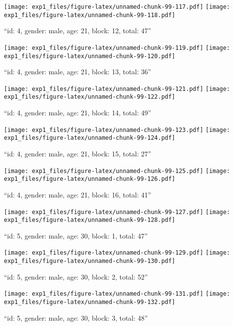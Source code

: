 \documentclass[,]{article}
\begin{document}
\texttt{[image: exp1\_files/figure-latex/unnamed-chunk-99-117.pdf]}
\texttt{[image: exp1\_files/figure-latex/unnamed-chunk-99-118.pdf]}

\newpage
[1] 

``id: 4, gender: male, age: 21, block: 12, total: 47''

\texttt{[image: exp1\_files/figure-latex/unnamed-chunk-99-119.pdf]}
\texttt{[image: exp1\_files/figure-latex/unnamed-chunk-99-120.pdf]}

\newpage
[1] 

``id: 4, gender: male, age: 21, block: 13, total: 36''

\texttt{[image: exp1\_files/figure-latex/unnamed-chunk-99-121.pdf]}
\texttt{[image: exp1\_files/figure-latex/unnamed-chunk-99-122.pdf]}

\newpage
[1] 

``id: 4, gender: male, age: 21, block: 14, total: 49''

\texttt{[image: exp1\_files/figure-latex/unnamed-chunk-99-123.pdf]}
\texttt{[image: exp1\_files/figure-latex/unnamed-chunk-99-124.pdf]}

\newpage
[1] 

``id: 4, gender: male, age: 21, block: 15, total: 27''

\texttt{[image: exp1\_files/figure-latex/unnamed-chunk-99-125.pdf]}
\texttt{[image: exp1\_files/figure-latex/unnamed-chunk-99-126.pdf]}

\newpage
[1] 

``id: 4, gender: male, age: 21, block: 16, total: 41''

\texttt{[image: exp1\_files/figure-latex/unnamed-chunk-99-127.pdf]}
\texttt{[image: exp1\_files/figure-latex/unnamed-chunk-99-128.pdf]}

\newpage
[1] 

``id: 5, gender: male, age: 30, block: 1, total: 47''

\texttt{[image: exp1\_files/figure-latex/unnamed-chunk-99-129.pdf]}
\texttt{[image: exp1\_files/figure-latex/unnamed-chunk-99-130.pdf]}

\newpage
[1] 

``id: 5, gender: male, age: 30, block: 2, total: 52''

\texttt{[image: exp1\_files/figure-latex/unnamed-chunk-99-131.pdf]}
\texttt{[image: exp1\_files/figure-latex/unnamed-chunk-99-132.pdf]}

\newpage
[1] 

``id: 5, gender: male, age: 30, block: 3, total: 48''
\end{document}
